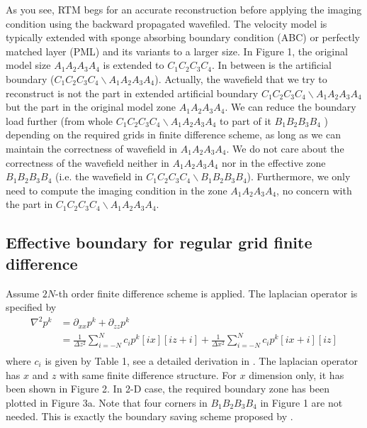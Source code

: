As you see, RTM begs for an accurate reconstruction before applying the imaging condition using the backward propagated wavefiled. The velocity model is typically extended with sponge absorbing boundary condition (ABC) \citep{cerjan1985nonreflecting} or perfectly matched layer (PML) and its variants \citep{komatitsch2007unsplit} to a larger size. In  Figure 1, the original model size $A_1A_2A_3A_4$ is extended to $C_1C_2C_3C_4$. In between is the artificial boundary ($C_1C_2C_3C_4\backslash A_1A_2A_3A_4$).
Actually, the wavefield that we try to reconstruct is not the part in extended artificial boundary $C_1C_2C_3C_4\backslash A_1A_2A_3A_4$ but the part in the original model zone $A_1A_2A_3A_4$. We can reduce the boundary load further (from whole $C_1C_2C_3C_4\backslash A_1A_2A_3A_4$ to part of it $B_1B_2B_3B_4$ ) depending on the required grids in finite difference scheme, as long as we can maintain the correctness of wavefield in $A_1A_2A_3A_4$. We do not care about the correctness of the wavefield neither in $A_1A_2A_3A_4$ nor in the effective zone $B_1B_2B_3B_4$ (i.e. the wavefield in $C_1C_2C_3C_4\backslash B_1B_2B_3B_4$). Furthermore, we only need to compute the imaging condition in the zone $A_1A_2A_3A_4$, no concern with the  part in $C_1C_2C_3C_4\backslash A_1A_2A_3A_4$.


\subsection{Effective boundary for regular grid finite difference}


Assume $2N$-th order finite difference scheme is applied. The laplacian operator is specified by
\begin{equation}
\begin{array}{rl}
 \nabla^2 p^{k}&=\partial_{xx}p^{k}+\partial_{zz}p^{k}\\
 &=\frac{1}{\Delta z^2}\sum_{i=-N}^Nc_ip^k[ix][iz+i]+\frac{1}{\Delta x^2}\sum_{i=-N}^Nc_i p^k[ix+i][iz]\\
\end{array}
\end{equation}
where $c_i$ is given by Table 1, see a detailed derivation in \cite{fornberg1988generation}. The laplacian operator has $x$ and $z$ with same finite difference structure. For $x$ dimension only, it has been shown in Figure 2. In 2-D case, the required boundary zone has been plotted in Figure 3a. Note that four corners in $B_1B_2B_3B_4$ in Figure 1 are not needed. This is exactly the boundary saving scheme proposed by \cite{dussaud2008computational}.

